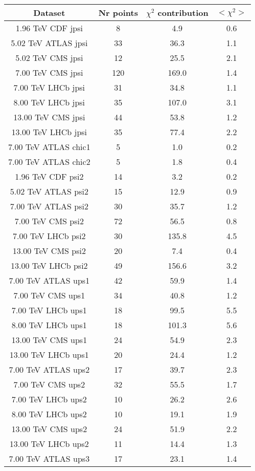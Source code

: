 \begin{table}[h!]
\centering
\begin{tabular}{c|c|c|c}
Dataset & Nr points & $\chi^2$ contribution & $<\chi^2>$ \\
\hline
1.96 TeV CDF jpsi & 8 & 4.9 & 0.6 \\
5.02 TeV ATLAS jpsi & 33 & 36.3 & 1.1 \\
5.02 TeV CMS jpsi & 12 & 25.5 & 2.1 \\
7.00 TeV CMS jpsi & 120 & 169.0 & 1.4 \\
7.00 TeV LHCb jpsi & 31 & 34.8 & 1.1 \\
8.00 TeV LHCb jpsi & 35 & 107.0 & 3.1 \\
13.00 TeV CMS jpsi & 44 & 53.8 & 1.2 \\
13.00 TeV LHCb jpsi & 35 & 77.4 & 2.2 \\
7.00 TeV ATLAS chic1 & 5 & 1.0 & 0.2 \\
7.00 TeV ATLAS chic2 & 5 & 1.8 & 0.4 \\
1.96 TeV CDF psi2 & 14 & 3.2 & 0.2 \\
5.02 TeV ATLAS psi2 & 15 & 12.9 & 0.9 \\
7.00 TeV ATLAS psi2 & 30 & 35.7 & 1.2 \\
7.00 TeV CMS psi2 & 72 & 56.5 & 0.8 \\
7.00 TeV LHCb psi2 & 30 & 135.8 & 4.5 \\
13.00 TeV CMS psi2 & 20 & 7.4 & 0.4 \\
13.00 TeV LHCb psi2 & 49 & 156.6 & 3.2 \\
7.00 TeV ATLAS ups1 & 42 & 59.9 & 1.4 \\
7.00 TeV CMS ups1 & 34 & 40.8 & 1.2 \\
7.00 TeV LHCb ups1 & 18 & 99.5 & 5.5 \\
8.00 TeV LHCb ups1 & 18 & 101.3 & 5.6 \\
13.00 TeV CMS ups1 & 24 & 54.9 & 2.3 \\
13.00 TeV LHCb ups1 & 20 & 24.4 & 1.2 \\
7.00 TeV ATLAS ups2 & 17 & 39.7 & 2.3 \\
7.00 TeV CMS ups2 & 32 & 55.5 & 1.7 \\
7.00 TeV LHCb ups2 & 10 & 26.2 & 2.6 \\
8.00 TeV LHCb ups2 & 10 & 19.1 & 1.9 \\
13.00 TeV CMS ups2 & 24 & 51.9 & 2.2 \\
13.00 TeV LHCb ups2 & 11 & 14.4 & 1.3 \\
7.00 TeV ATLAS ups3 & 17 & 23.1 & 1.4 \\

\end{tabular}
\end{table}
